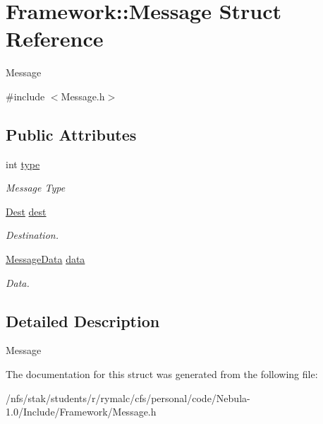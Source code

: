 \hypertarget{structFramework_1_1Message}{
\section{Framework::Message Struct Reference}
\label{structFramework_1_1Message}
}


Message  


{\ttfamily \#include $<$Message.h$>$}\subsection*{Public Attributes}
\begin{DoxyCompactItemize}
\item 
\hypertarget{structFramework_1_1Message_a2dcb2dd75a200b550e3146f74a9dc271}{
int \hyperlink{structFramework_1_1Message_a2dcb2dd75a200b550e3146f74a9dc271}{type}}
\label{structFramework_1_1Message_a2dcb2dd75a200b550e3146f74a9dc271}

\begin{DoxyCompactList}\small\item\em Message Type \item\end{DoxyCompactList}\item 
\hypertarget{structFramework_1_1Message_ab406fd964e032b78e5f30b14cd34ec99}{
\hyperlink{structFramework_1_1Dest}{Dest} \hyperlink{structFramework_1_1Message_ab406fd964e032b78e5f30b14cd34ec99}{dest}}
\label{structFramework_1_1Message_ab406fd964e032b78e5f30b14cd34ec99}

\begin{DoxyCompactList}\small\item\em Destination. \item\end{DoxyCompactList}\item 
\hypertarget{structFramework_1_1Message_a682e1549c99aa31ac7729619ade6d5b8}{
\hyperlink{structFramework_1_1MessageData}{MessageData} \hyperlink{structFramework_1_1Message_a682e1549c99aa31ac7729619ade6d5b8}{data}}
\label{structFramework_1_1Message_a682e1549c99aa31ac7729619ade6d5b8}

\begin{DoxyCompactList}\small\item\em Data. \item\end{DoxyCompactList}\end{DoxyCompactItemize}


\subsection{Detailed Description}
Message 

The documentation for this struct was generated from the following file:\begin{DoxyCompactItemize}
\item 
/nfs/stak/students/r/rymalc/cfs/personal/code/Nebula-\/1.0/Include/Framework/Message.h\end{DoxyCompactItemize}

